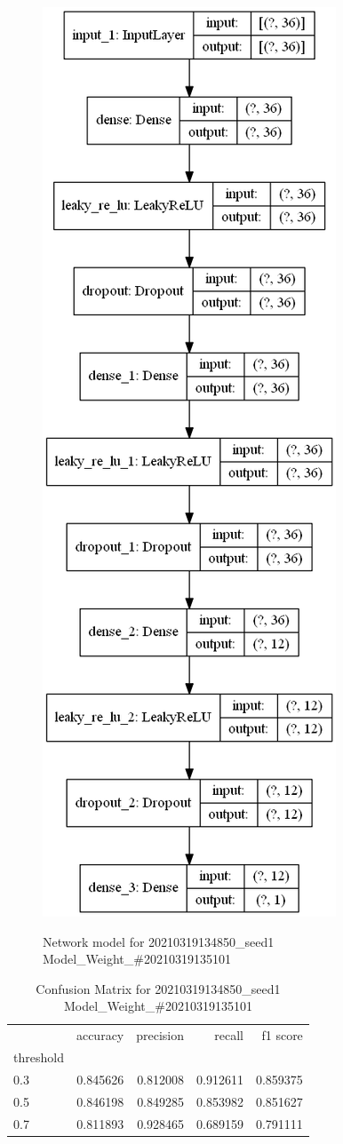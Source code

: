        \begin{figure}
        \caption{Network model for 20210319134850\_seed1 Model\_Weight\_\#20210319135101}
        \centering
            \includegraphics[width=0.5\linewidth]{20210319134850_seed1/ModelWeight20210319135101/model_struct.png}
        \label{fig:20210319134850seed1/ModelWeight20210319135101/modelstruct.png}
        \end{figure}
        \begin{table}
\centering
\caption{Confusion Matrix for 20210319134850\_seed1 Model\_Weight\_\#20210319135101}
\label{tab:conf_matr20210319134850seed1ModelWeight20210319135101}
\begin{tabular}{lrrrr}
\toprule
{} &  accuracy &  precision &    recall &  f1 score \\
threshold &           &            &           &           \\
\midrule
0.3       &  0.845626 &   0.812008 &  0.912611 &  0.859375 \\
0.5       &  0.846198 &   0.849285 &  0.853982 &  0.851627 \\
0.7       &  0.811893 &   0.928465 &  0.689159 &  0.791111 \\
\bottomrule
\end{tabular}
\end{table}
